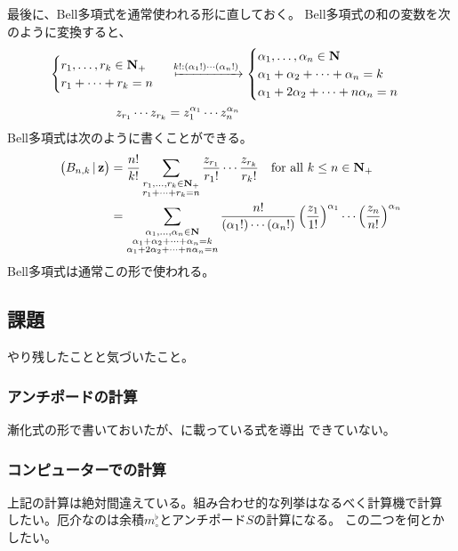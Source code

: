 {	最後に、Bell多項式を通常使われる形に直しておく。
	Bell多項式の和の変数を次のように変換すると、
	\begin{equation*}\begin{split}
		\begin{cases}
				r_1,\dots,r_k\in\sizen_+ \\
				r_1+\cdots+r_k=n
		\end{cases} &\xmapsto{k!:(\alpha_1!)\cdots(\alpha_n!)} \begin{cases}
			\alpha_1,\dots,\alpha_n\in\sizen \\
			\alpha_1 + \alpha_2 +\cdots+ \alpha_n = k \\
			\alpha_1 + 2\alpha_2 +\cdots+ n\alpha_n = n \\
		\end{cases} \\
		z_{r_1}\cdots z_{r_k} &= z_1^{\alpha_1}\cdots z_n^{\alpha_n}
	\end{split}\end{equation*}
	Bell多項式は次のように書くことができる。
	\begin{equation*}\begin{split}
		\mathinner{\bigl({B_{n,k}\,\vert\,\mathbf{z}}\bigr)} &= \frac{n!}{k!}
			\sum_{\substack{r_1,\dots,r_k\in\mathbf{N}_+\\r_1+\cdots+r_k=n}} 
			\frac{z_{r_1}}{r_1!}\cdots\frac{z_{r_k}}{r_k!}
			\quad\text{for all } k\le n\in\mathbf{N}_+ \\
		&= \sum_{\substack{\alpha_1,\dots,\alpha_n\in\mathbf{N} \\
			\alpha_1+\alpha_2+\cdots+\alpha_n=k \\
			\alpha_1+2\alpha_2+\cdots+n\alpha_n=n}} 
			\frac{n!}{(\alpha_1!)\cdots(\alpha_n!)}
			\mathinner{\left({\frac{z_1}{1!}}\right)}^{\alpha_1}\cdots\mathinner{\left({\frac{z_n}{n!}}\right)}^{\alpha_n}
	\end{split}\end{equation*}
	Bell多項式は通常この形で使われる。
\subsection{課題}\label{s2:課題} %
	やり残したことと気づいたこと。
\subsubsection{アンチポードの計算}\label{s3:アンチポードの計算} %
	漸化式の形で書いておいたが、\cite{Figueroa:2005}に載っている式を導出
	できていない。
\subsubsection{コンピューターでの計算}\label{s3:コンピューターでの計算} %
	上記の計算は絶対間違えている。組み合わせ的な列挙はなるべく計算機で計算
	したい。厄介なのは余積$m_\circ^\flat$とアンチポード$S$の計算になる。
	この二つを何とかしたい。
}
